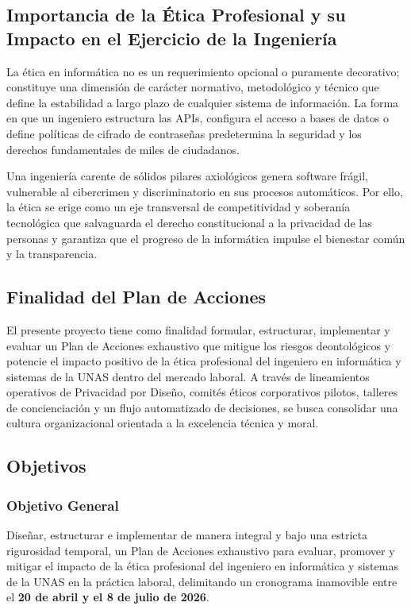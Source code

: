 \documentclass[12pt,a4paper]{article}
\begin{document}
\subsection{Importancia de la Ética Profesional y su Impacto en el Ejercicio de la Ingeniería}
La ética en informática no es un requerimiento opcional o puramente decorativo; constituye una dimensión de carácter normativo, metodológico y técnico que define la estabilidad a largo plazo de cualquier sistema de información. La forma en que un ingeniero estructura las APIs, configura el acceso a bases de datos o define políticas de cifrado de contraseñas predetermina la seguridad y los derechos fundamentales de miles de ciudadanos. 

Una ingeniería carente de sólidos pilares axiológicos genera software frágil, vulnerable al cibercrimen y discriminatorio en sus procesos automáticos. Por ello, la ética se erige como un eje transversal de competitividad y soberanía tecnológica que salvaguarda el derecho constitucional a la privacidad de las personas y garantiza que el progreso de la informática impulse el bienestar común y la transparencia.

\subsection{Finalidad del Plan de Acciones}
El presente proyecto tiene como finalidad formular, estructurar, implementar y evaluar un Plan de Acciones exhaustivo que mitigue los riesgos deontológicos y potencie el impacto positivo de la ética profesional del ingeniero en informática y sistemas de la UNAS dentro del mercado laboral. A través de lineamientos operativos de Privacidad por Diseño, comités éticos corporativos pilotos, talleres de concienciación y un flujo automatizado de decisiones, se busca consolidar una cultura organizacional orientada a la excelencia técnica y moral.

\subsection{Objetivos}

\subsubsection{Objetivo General}
Diseñar, estructurar e implementar de manera integral y bajo una estricta rigurosidad temporal, un Plan de Acciones exhaustivo para evaluar, promover y mitigar el impacto de la ética profesional del ingeniero en informática y sistemas de la UNAS en la práctica laboral, delimitando un cronograma inamovible entre el \textbf{20 de abril y el 8 de julio de 2026}.
\end{document}

